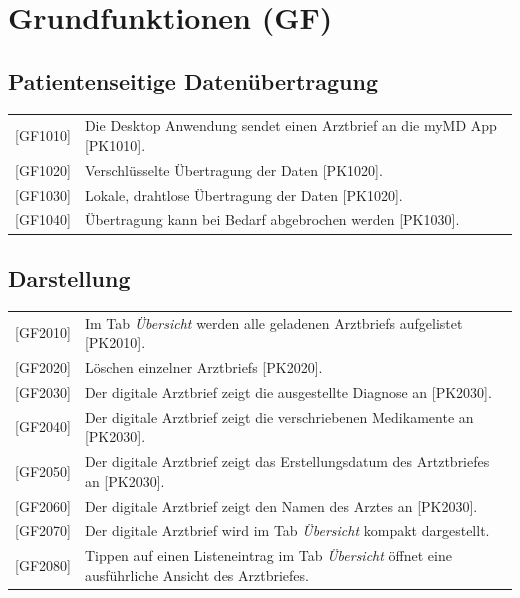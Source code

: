 \documentclass[a4paper]{scrreprt}
\begin{document}
\section{Grundfunktionen (GF)}
\subsection{Patientenseitige Datenübertragung}
\begin{tabular}{lll}
[GF1010]&  \multicolumn{2}{p{12cm}}{Die \gls{Desktop Anwendung} sendet einen \gls{Arztbrief} an die myMD \gls{App} [PK1010].}\\
{[GF1020]} &  \multicolumn{2}{p{12cm}}{Verschlüsselte Übertragung der Daten [PK1020].}  \\
{[GF1030]} &  \multicolumn{2}{p{12cm}}{Lokale, drahtlose Übertragung der Daten [PK1020].}  \\
{[GF1040]} &  \multicolumn{2}{p{12cm}}{Übertragung kann bei Bedarf abgebrochen werden [PK1030].}  \\
\end{tabular}

\subsection{Darstellung}
\begin{tabular}{lll}
{[GF2010]}&  \multicolumn{2}{p{12cm}}{Im \gls{Tab} \textit{Übersicht} werden alle geladenen \glspl{Arztbrief} aufgelistet [PK2010].} \\
{[GF2020]} &  \multicolumn{2}{p{12cm}}{Löschen einzelner \glspl{Arztbrief} [PK2020].}  \\
{[GF2030]} &  \multicolumn{2}{p{12cm}}{Der digitale \gls{Arztbrief} zeigt die ausgestellte Diagnose an [PK2030].}  \\
{[GF2040]} &  \multicolumn{2}{p{12cm}}{Der digitale \gls{Arztbrief} zeigt die verschriebenen \gls{Medikament}e an [PK2030].}  \\
{[GF2050]} &  \multicolumn{2}{p{12cm}}{Der digitale \gls{Arztbrief} zeigt das Erstellungsdatum des Artztbriefes an [PK2030].}  \\
{[GF2060]} &  \multicolumn{2}{p{12cm}}{Der digitale \gls{Arztbrief} zeigt den Namen des Arztes an [PK2030].}  \\
{[GF2070]} &  \multicolumn{2}{p{12cm}}{Der digitale \gls{Arztbrief} wird im \gls{Tab} \textit{Übersicht} kompakt dargestellt.}  \\
{[GF2080]} &  \multicolumn{2}{p{12cm}}{Tippen auf einen Listeneintrag im \gls{Tab} \textit{Übersicht} öffnet eine ausführliche Ansicht des Arztbriefes.}  \\
\end{tabular}
\end{document}
